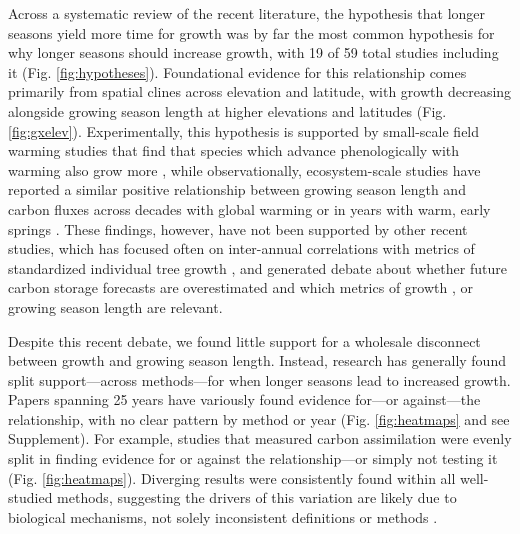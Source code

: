 \documentclass[11pt]{article}
\begin{document}
Across a systematic review of the recent literature, the hypothesis that longer seasons yield more time for growth was by far the most common hypothesis for why longer seasons should increase growth, with 19 of 59 total studies including it (Fig. \ref{fig:hypotheses}). Foundational evidence for this relationship comes primarily from spatial clines across elevation and latitude, with growth decreasing alongside growing season length at higher elevations and latitudes (Fig. \ref{fig:gxelev}). Experimentally, this hypothesis is supported by small-scale field warming studies that find that species which advance phenologically with warming also grow more \citep[][]{Cleland:2012}, while observationally, ecosystem-scale studies have reported a similar positive relationship between growing season length and carbon fluxes across decades with global warming \citep{keenan2014net} or in years with warm, early springs \citep{chen1999effects}. These findings, however, have not been supported by other recent studies, which has focused often on inter-annual correlations with metrics of standardized individual tree growth \citep{dow2022warm,silvestro2023longer}, and generated debate about whether future carbon storage forecasts are overestimated and which metrics of growth \citep{green2022limits}, or growing season length \citep{korner2023four} are relevant.

Despite this recent debate, we found little support for a wholesale disconnect between growth and growing season length. Instead, research has generally found split support---across methods---for when longer seasons lead to increased growth. Papers spanning 25 years have variously found evidence for---or against---the relationship, with no clear pattern by method or year (Fig. \ref{fig:heatmaps} and see Supplement). For example, studies that measured carbon assimilation were evenly split in finding evidence for or against the relationship---or simply not testing it (Fig. \ref{fig:heatmaps}). Diverging results were consistently found within all well-studied methods, suggesting the drivers of this variation are likely due to biological mechanisms, not solely inconsistent definitions or methods \citep[as some, e.g. ][have recently suggested]{green2022limits,korner2023four}. 
\end{document}

